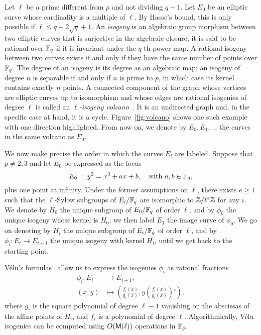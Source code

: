 \documentclass{sig-alternate}
\begin{document}
Let $\ell$ be a prime different from $p$ and not dividing $q-1$. Let
$E_0$ be an elliptic curve whose cardinality is a multiple of
$\ell$. By Hasse's bound, this is only possible if $\ell\le q +
2\sqrt{q} + 1$. An \emph{isogeny} is an algebraic group morphism
between two elliptic curves that is surjective in the algebraic
closure; it is said to be rational over $\mathbb{F}_q$ if it is invariant
under the $q$-th power map. A rational isogeny between two curves
exists if and only if they have the same number of points over
$\mathbb{F}_q$. The degree of an isogeny is its degree as an algebraic map; an
isogeny of degree $n$ is separable if and only if $n$ is prime to $p$,
in which case its kernel contains exactly $n$ points. A connected
component of the graph whose vertices are elliptic curves up to
isomorphism and whose edges are rational isogenies of degree $\ell$ is
called an \emph{$\ell$-isogeny
  volcano}~\cite{kohel,fouquet+morain02}. It is an undirected graph
and, in the specific case at hand, it is a cycle.
Figure~\ref{fig:volcano} shows one such example with one direction
highlighted. From now on, we denote by $E_0,E_1,\dots$ the curves in
the same volcano as $E_0$.

We now make precise the order in which the curves $E_i$ are
labeled. Suppose that $p\ne2,3$ and let $E_0$ be expressed as the
locus
\begin{equation}
  E_0 \;:\; y^2 = x^3 + ax + b,
  \quad\text{with $a,b\in\mathbb{F}_q$},
\end{equation}
plus one point at infinity. Under the former assumptions on $\ell$,
there exists $e\ge1$ such that the $\ell$-Sylow subgroups of
$E_i/\mathbb{F}_q$ are isomorphic to $\mathbb{Z}/\ell^e\mathbb{Z}$ for any $i$. We denote by
$H_0$ the unique subgroup of $E_0/\mathbb{F}_q$ of order $\ell$, and by
$\phi_0$ the unique isogeny whose kernel is $H_0$; we then label $E_1$
the image curve of $\phi_0$. We go on denoting by $H_i$ the unique
subgroup of $E_i/\mathbb{F}_q$ of order $\ell$, and by $\phi_i:E_i\to E_{i+1}$
the unique isogeny with kernel $H_i$, until we get back to the
starting point.

Vélu's formulas~\cite{velu71} allow us to express the isogenies
$\phi_i$ as rational fractions
\begin{equation}
  \begin{aligned}
    \phi_i: E_i &\to E_{i+1},\\
    (x,y) &\mapsto \left(\frac{f_i(x)}{g_i(x)}, y\left(\frac{f_i(x)}{g_i(x)}\right)'\right),
  \end{aligned}
\end{equation}
where $g_i$ is the square polynomial of degree $\ell-1$ vanishing on
the abscissas of the affine points of $H_i$, and $f_i$ is a polynomial
of degree $\ell$. Algorithmically, Vélu isogenies can be computed
using $O(\mathsf{M}(\ell))$ operations in $\mathbb{F}_q$. 
\end{document}
